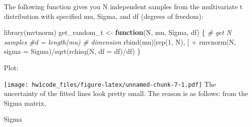\documentclass[
]{article}
\newenvironment{Shaded}{\begin{snugshade}}{\end{snugshade}}
\newcommand{\AttributeTok}[1]{\textcolor[rgb]{0.77,0.63,0.00}{#1}}
\newcommand{\CommentTok}[1]{\textcolor[rgb]{0.56,0.35,0.01}{\textit{#1}}}
\newcommand{\ControlFlowTok}[1]{\textcolor[rgb]{0.13,0.29,0.53}{\textbf{#1}}}
\newcommand{\DecValTok}[1]{\textcolor[rgb]{0.00,0.00,0.81}{#1}}
\newcommand{\FunctionTok}[1]{\textcolor[rgb]{0.00,0.00,0.00}{#1}}
\newcommand{\NormalTok}[1]{#1}
\newcommand{\OtherTok}[1]{\textcolor[rgb]{0.56,0.35,0.01}{#1}}
\newcommand{\SpecialCharTok}[1]{\textcolor[rgb]{0.00,0.00,0.00}{#1}}
\newcommand{\StringTok}[1]{\textcolor[rgb]{0.31,0.60,0.02}{#1}}
\begin{document}
The following function gives you N independent samples from the
multivariate t distribution with specified mu, Sigma, and df (degrees of
freedom):

\begin{Shaded}
\begin{Highlighting}[]
\FunctionTok{library}\NormalTok{(mvtnorm)}
\NormalTok{get\_random\_t }\OtherTok{\textless{}{-}} \ControlFlowTok{function}\NormalTok{(N, mu, Sigma, df) \{}
  \CommentTok{\# get N samples}
  \CommentTok{\#d = length(mu) \# dimension}
  \FunctionTok{rbind}\NormalTok{(mu)[}\FunctionTok{rep}\NormalTok{(}\DecValTok{1}\NormalTok{, N), ] }\SpecialCharTok{+} \FunctionTok{rmvnorm}\NormalTok{(N, }\AttributeTok{sigma =}\NormalTok{ Sigma)}\SpecialCharTok{/}\FunctionTok{sqrt}\NormalTok{(}\FunctionTok{rchisq}\NormalTok{(N, }\AttributeTok{df =}\NormalTok{ df)}\SpecialCharTok{/}\NormalTok{df)}
\NormalTok{\}}
\end{Highlighting}
\end{Shaded}

Plot:

\begin{Shaded}
\end{Shaded}

\texttt{[image: hw1code\_files/figure-latex/unnamed-chunk-7-1.pdf]} The
uncertainty of the fitted lines look pretty small. The reason is as
follows: from the Sigma matrix,

\begin{Shaded}
\begin{Highlighting}[]
\NormalTok{Sigma}
\end{Highlighting}
\end{Shaded}
\end{document}
